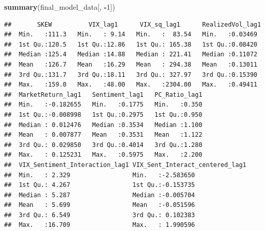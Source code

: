 \documentclass[
]{article}
\newenvironment{Shaded}{\begin{snugshade}}{\end{snugshade}}
\newcommand{\DecValTok}[1]{\textcolor[rgb]{0.00,0.00,0.81}{#1}}
\newcommand{\FunctionTok}[1]{\textcolor[rgb]{0.13,0.29,0.53}{\textbf{#1}}}
\newcommand{\NormalTok}[1]{#1}
\newcommand{\SpecialCharTok}[1]{\textcolor[rgb]{0.81,0.36,0.00}{\textbf{#1}}}
\begin{document}
\begin{Shaded}
\begin{Highlighting}[]
  \FunctionTok{summary}\NormalTok{(final\_model\_data[, }\SpecialCharTok{{-}}\DecValTok{1}\NormalTok{])}
\end{Highlighting}
\end{Shaded}

\begin{verbatim}
##       SKEW          VIX_lag1      VIX_sq_lag1      RealizedVol_lag1 
##  Min.   :111.3   Min.   : 9.14   Min.   :  83.54   Min.   :0.03469  
##  1st Qu.:120.5   1st Qu.:12.86   1st Qu.: 165.38   1st Qu.:0.08420  
##  Median :125.4   Median :14.88   Median : 221.41   Median :0.11072  
##  Mean   :126.7   Mean   :16.29   Mean   : 294.38   Mean   :0.13011  
##  3rd Qu.:131.7   3rd Qu.:18.11   3rd Qu.: 327.97   3rd Qu.:0.15390  
##  Max.   :159.0   Max.   :48.00   Max.   :2304.00   Max.   :0.49411  
##  MarketReturn_lag1   Sentiment_lag1   PC_Ratio_lag1  
##  Min.   :-0.182655   Min.   :0.1775   Min.   :0.350  
##  1st Qu.:-0.008998   1st Qu.:0.2975   1st Qu.:0.950  
##  Median : 0.012476   Median :0.3534   Median :1.100  
##  Mean   : 0.007877   Mean   :0.3531   Mean   :1.122  
##  3rd Qu.: 0.029850   3rd Qu.:0.4014   3rd Qu.:1.280  
##  Max.   : 0.125231   Max.   :0.5975   Max.   :2.200  
##  VIX_Sentiment_Interaction_lag1 VIX_Sent_Interact_centered_lag1
##  Min.   : 2.329                 Min.   :-2.583650              
##  1st Qu.: 4.267                 1st Qu.:-0.153735              
##  Median : 5.287                 Median :-0.005704              
##  Mean   : 5.699                 Mean   :-0.051596              
##  3rd Qu.: 6.549                 3rd Qu.: 0.102383              
##  Max.   :16.709                 Max.   : 1.990596
\end{verbatim}
\end{document}
